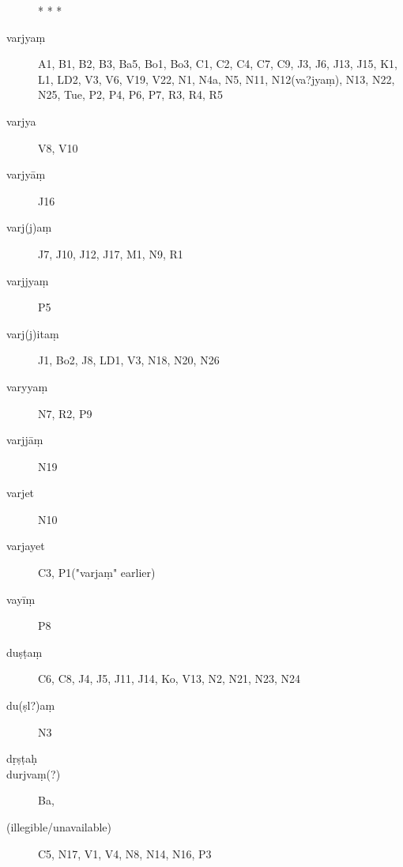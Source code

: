 \begin{ekdosis}
\begin{marma}[hp01_055]
\begin{marma}[hp01_060]
\begin{description}
        * * *
      \item[varjyaṃ] A1, B1, B2, B3, Ba5, Bo1, Bo3, C1, C2, C4, C7, C9, J3, J6, J13, J15, K1, L1, LD2, V3, V6, V19, V22, N1, N4a, N5, N11, N12(va?jyaṃ), N13, N22, N25, Tue, P2, P4, P6, P7, R3, R4, R5
      \item[varjya] V8, V10
      \item[varjyāṃ] J16
      \item[varj(j)aṃ] J7, J10, J12, J17, M1, N9, R1
      \item[varjjyaṃ]  P5
      \item[varj(j)itaṃ] J1, Bo2, J8, LD1, V3, N18, N20, N26
      \item[varyyaṃ]   N7, R2, P9
      \item[varjjāṃ]   N19
      \item[varjet]  N10
      \item[varjayet] C3, P1("varjaṃ" earlier)
      \item[vayīṃ]   P8
      \item[duṣṭaṃ] C6, C8, J4, J5, J11, J14, Ko, V13, N2, N21, N23, N24
      \item[du(ṣl?)aṃ]  N3
      \item[dṛṣṭaḥ]
      \item[durjvaṃ(?)] Ba,
      \item[(illegible/unavailable)] C5, N17, V1, V4, N8, N14, N16, P3
      \end{description}
    \end{marma}



\end{marma}
\end{ekdosis}

